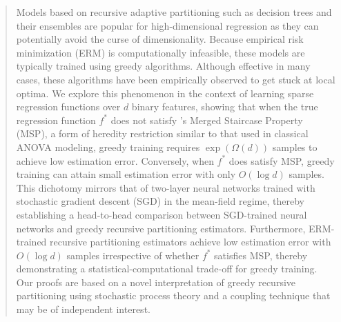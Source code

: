 \documentclass[11pt]{article}
\newcommand{\bx}{\mathbf{x}}
\newcommand{\nfeats}{d}
\newcommand{\comment}[2]{{#2}}
\begin{document}
\begin{abstract}
\end{abstract}

\fi

\begin{abstract}
Models based on recursive adaptive partitioning such as decision trees and their ensembles are popular for high-dimensional regression as they can potentially avoid the curse of dimensionality. Because empirical risk minimization (ERM) is computationally infeasible, these models are typically trained using greedy algorithms. 
Although effective in many cases, these algorithms have been empirically observed to get stuck at local optima. 
We explore this phenomenon in the context of learning sparse regression functions over $\nfeats$ binary features, showing that when the true regression function $f^*$ does not satisfy \cite{abbe2022merged}'s Merged Staircase Property (MSP), \comment{red}{a form of heredity restriction similar to that used in classical ANOVA modeling}, greedy training requires $\exp(\Omega(\nfeats))$ samples to achieve low estimation error. 
Conversely, when $f^*$ does satisfy MSP, greedy training can attain small estimation error with only $O(\log \nfeats)$ samples. 
This dichotomy mirrors that of two-layer neural networks trained with stochastic gradient descent (SGD) in the mean-field regime, thereby establishing a head-to-head comparison between SGD-trained neural networks and greedy recursive partitioning estimators. 
Furthermore, ERM-trained recursive partitioning estimators achieve low estimation error with $O(\log \nfeats)$ samples irrespective of whether $f^*$ satisfies MSP, thereby demonstrating a statistical-computational trade-off for greedy training. Our proofs are based on a novel interpretation of greedy recursive partitioning using stochastic process theory and a coupling technique that may be of independent interest.
\end{abstract}
\end{document}
